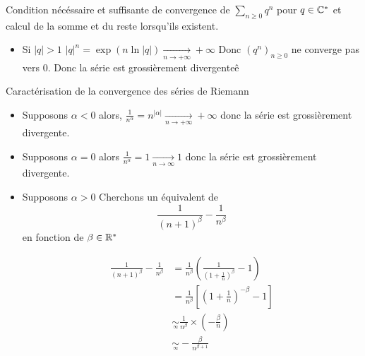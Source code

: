 \documentclass{article}
\begin{document}
\begin{question_kholle}{Condition nécéssaire et suffisante de convergence de $\sum_{n\geqslant 0}q^{n}$ pour $q \in \mathbb C^{*}$ et calcul de la somme et du reste lorsqu'ils existent.}
\begin{itemize}[label=$\star$]
        $$\forall n \in \N, \lvert q \rvert ^{n} = 1^{n}=1 \xrightarrow[n \to \infty]{}1$$
        
        Ainsi, $\lvert q \rvert^{n}$ ne converge pas vers 0 donc $(q^{n})_{n\geqslant 0}$ ne converge pas vers 0, donc la série est grossièrement divergente.
        
        \item Si $\lvert q \rvert>1$
        $\lvert q \rvert^{n}=\exp(n \ln \lvert q \rvert) \xrightarrow[n\to +\infty]{} +\infty$
        Donc $(q^{n})_{n\geqslant 0}$ ne converge pas vers $0$. Donc la série est grossièrement divergenteê
    \end{itemize}
\end{question_kholle}
\begin{question_kholle}{Caractérisation de la convergence des séries de Riemann}
    \begin{itemize}[label=$\lozenge$]
        \item Supposons $\alpha < 0$ alors, $\frac{1}{n^{\alpha}}=n^{\lvert \alpha \rvert} \xrightarrow[n\to +\infty]{}+\infty$ donc la série est grossièrement divergente.
        \item Supposons $\alpha = 0$ alors $\frac{1}{n^{\alpha}}=1 \xrightarrow[n \to \infty]{} 1$ donc la série est grossièrement divergente.
        \item Supposons $\alpha > 0$
        Cherchons un équivalent de 
$$
        \frac{1}{(n+1)^{\beta}}-\frac{1}{n^{\beta}}
$$
        en fonction de $\beta \in \mathbb R^{*}$
        
        \begin{align*}
            \frac{1}{(n+1)^{\beta}} - \frac{1}{n^{\beta}} &= 
            \frac{1}{n^{\beta}}\left( \frac{1}{\left( 1+\frac{1}{n} \right)^{\beta}} - 1 \right) \\
            &= \frac{1}{n^{\beta}}\left[ \left( 1+\frac{1}{n} \right)^{-\beta} - 1\right]  \\
            &\underset{ \overset {\infty} {} } {\sim} \frac{1}{n^{\beta}} \times \left( -\frac{\beta}{n} \right) \\
            &\underset{ \overset {\infty} {} } {\sim} - \frac{\beta}{n^{\beta+1}}
        \end{align*}
        

\end{itemize}
\end{question_kholle}
\end{document}
